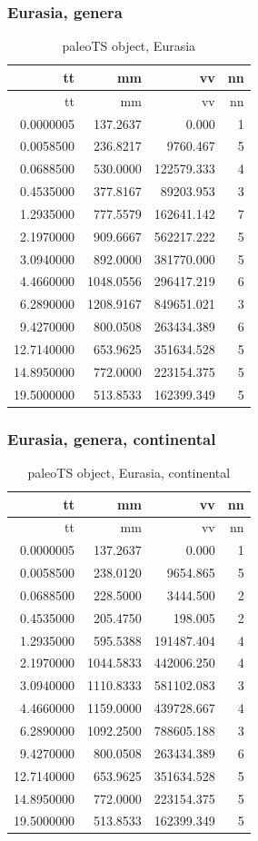 \FloatBarrier

\subsubsection*{Eurasia,	genera}\label{eurasia-genera}


\begin{longtable}[]{@{}rrrr@{}}
	\caption{paleoTS object, Eurasia}
	\label{tab:pTSEs}\tabularnewline
	\toprule
	tt & mm & vv & nn\tabularnewline
	\midrule
	\endfirsthead
	\toprule
	tt & mm & vv & nn\tabularnewline
	\midrule
	\endhead
	0.0000005 & 137.2637 & 0.000 & 1\tabularnewline
	0.0058500 & 236.8217 & 9760.467 & 5\tabularnewline
	0.0688500 & 530.0000 & 122579.333 & 4\tabularnewline
	0.4535000 & 377.8167 & 89203.953 & 3\tabularnewline
	1.2935000 & 777.5579 & 162641.142 & 7\tabularnewline
	2.1970000 & 909.6667 & 562217.222 & 5\tabularnewline
	3.0940000 & 892.0000 & 381770.000 & 5\tabularnewline
	4.4660000 & 1048.0556 & 296417.219 & 6\tabularnewline
	6.2890000 & 1208.9167 & 849651.021 & 3\tabularnewline
	9.4270000 & 800.0508 & 263434.389 & 6\tabularnewline
	12.7140000 & 653.9625 & 351634.528 & 5\tabularnewline
	14.8950000 & 772.0000 & 223154.375 & 5\tabularnewline
	19.5000000 & 513.8533 & 162399.349 & 5\tabularnewline
	\bottomrule
\end{longtable}




\subsubsection*{Eurasia, genera,
	continental}\label{eurasiagenera-continental}

\begin{longtable}[]{@{}rrrr@{}}
	\caption{paleoTS object, Eurasia, continental}
	\label{tab:pTSEsC}\tabularnewline
	\toprule
	tt & mm & vv & nn\tabularnewline
	\midrule
	\endfirsthead
	\toprule
	tt & mm & vv & nn\tabularnewline
	\midrule
	\endhead
	0.0000005 & 137.2637 & 0.000 & 1\tabularnewline
	0.0058500 & 238.0120 & 9654.865 & 5\tabularnewline
	0.0688500 & 228.5000 & 3444.500 & 2\tabularnewline
	0.4535000 & 205.4750 & 198.005 & 2\tabularnewline
	1.2935000 & 595.5388 & 191487.404 & 4\tabularnewline
	2.1970000 & 1044.5833 & 442006.250 & 4\tabularnewline
	3.0940000 & 1110.8333 & 581102.083 & 3\tabularnewline
	4.4660000 & 1159.0000 & 439728.667 & 4\tabularnewline
	6.2890000 & 1092.2500 & 788605.188 & 3\tabularnewline
	9.4270000 & 800.0508 & 263434.389 & 6\tabularnewline
	12.7140000 & 653.9625 & 351634.528 & 5\tabularnewline
	14.8950000 & 772.0000 & 223154.375 & 5\tabularnewline
	19.5000000 & 513.8533 & 162399.349 & 5\tabularnewline
	\bottomrule
\end{longtable}

